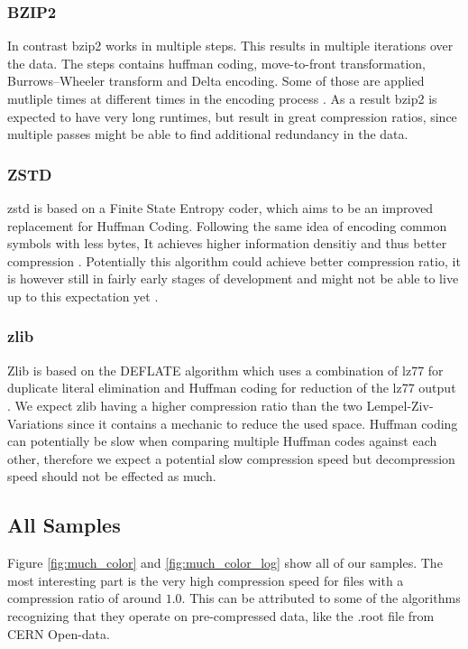 \documentclass[
	12pt,
	a4paper,
	BCOR10mm,
	DIV14,
	listof=totoc,
	bibliography=totoc,
	headsepline
]{scrreprt}
\begin{document}
\subsubsection{BZIP2}
In contrast bzip2 works in multiple steps. This results in multiple iterations over the data.
The steps contains huffman coding, move-to-front transformation, Burrows–Wheeler transform and Delta encoding.
Some of those are applied mutliple times at different times in the encoding process \cite{bzip2}.
As a result bzip2 is expected to have very long runtimes, but result in great compression ratios, since multiple passes might be able to find additional redundancy in the data.

\subsubsection{ZSTD}
zstd is based on a Finite State Entropy coder, which aims to be an improved replacement for Huffman Coding.
Following the same idea of encoding common symbols with less bytes, It achieves higher information densitiy and thus better compression \cite{fse}.
Potentially this algorithm could achieve better compression ratio, it is however still in fairly early stages of development and might not be able to live up to this expectation yet \cite{zstd}.

\subsubsection{zlib}
Zlib is based on the DEFLATE algorithm which uses a combination of lz77 for duplicate literal elimination and Huffman coding for reduction of the lz77 output \cite{zlib}.
We expect zlib having a higher compression ratio than the two Lempel-Ziv-Variations since it contains a mechanic to reduce the used space.
Huffman coding can potentially be slow when comparing multiple Huffman codes against each other, therefore we expect a potential slow compression speed but decompression speed should not be effected as much.



\subsection{All Samples}



Figure \ref{fig:much_color} and \ref{fig:much_color_log} show all of our samples. The most interesting part is the very high compression speed for files with a compression ratio of around $1.0$. This can be attributed to some of the algorithms recognizing that they operate on pre-compressed data, like the .root file from CERN Open-data.
\end{document}
